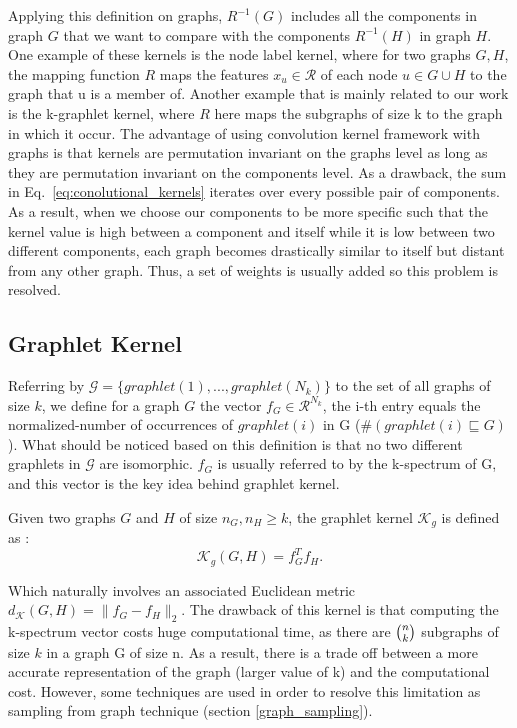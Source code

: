  Applying this definition on graphs, $R^{-1}(G)$ includes all the components in graph $G$  that we want to compare with the components $R^{-1}(H)$ in graph $H$. One example of these kernels is the node label kernel, where for two graphs $G, H$, the mapping function $R$ maps the features $x_u\in \mathcal{R}$ of each node $u\in G\cup H$ to the graph that u is a member of. Another example that is mainly related to our work is the k-graphlet kernel, where $R$ here maps the subgraphs of size k to the graph in which it occur. The advantage of using convolution kernel framework with graphs is that kernels are permutation invariant on the graphs level as long as they are permutation invariant on the components level. 
 As a drawback, the sum in Eq.~\ref{eq:conolutional_kernels} iterates over every possible pair of components. As a result, when we choose our components to be more specific such that the kernel value is high between a component and itself while it is low between two different components, each graph becomes drastically similar to itself but distant from any other graph. Thus, a set of weights is usually added  so this problem is resolved.


\subsection{Graphlet Kernel}
\label{subsection: graphlet kernel}
Referring by $\mathcal{G}=\{graphlet(1),..., graphlet(N_k)\}$ to the set of all graphs of size $k$, we define for a graph $G$ the vector $f_G\in \mathcal{R}^{N_k}$, the i-th entry equals the normalized-number of occurrences of $graphlet(i)$ in G ($\#(graphlet(i)\sqsubseteq G)$). What should be noticed based on this definition is that no two different graphlets in $\mathcal{G}$ are isomorphic. $f_G$ is usually referred to by the k-spectrum of G, and this vector is the key idea behind graphlet kernel. 


\begin{definition}
Given two graphs $G$ and $H$ of size $n_G,n_H \geq k$, the graphlet kernel $\mathcal{K}_g$ is defined as \citep{graphlet_kernel}:
\begin{equation}
\label{eq:graphlet_kernel}
    \mathcal{K}_g(G,H)=f_G^Tf_H.
\end{equation}
\end{definition}
Which naturally involves an associated Euclidean metric $d_\mathcal{K}(G,H) = \|f_G - f_{H}\|_2$.
The drawback of this kernel is that computing the k-spectrum vector costs huge computational time, as there are $\tbinom{n}{k}$  subgraphs of size $k$ in a graph G of size n. As a result, there is a trade off between a more accurate representation of the graph (larger value of k) and the computational cost. However, some techniques are used in order to resolve this limitation as sampling from graph technique (section \ref{graph_sampling}).

